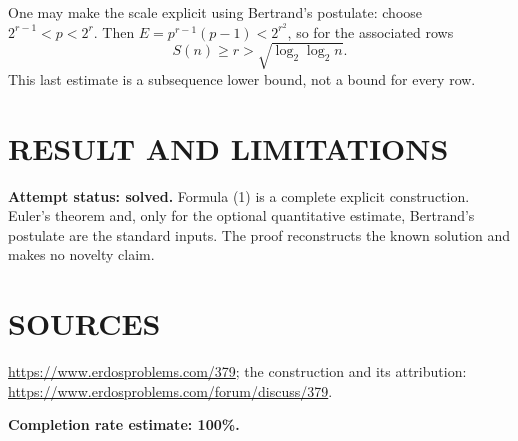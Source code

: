 One may make the scale explicit using Bertrand's postulate: choose $2^{r-1}<p<2^r$. Then $E=p^{r-1}(p-1)<2^{r^2}$, so for the associated rows
\[
S(n)\geq r>\sqrt{\log_2\log_2 n}.
\]
This last estimate is a subsequence lower bound, not a bound for every row.

\section{RESULT AND LIMITATIONS}
\textbf{Attempt status: solved.} Formula (1) is a complete explicit construction. Euler's theorem and, only for the optional quantitative estimate, Bertrand's postulate are the standard inputs. The proof reconstructs the known solution and makes no novelty claim.

\section{SOURCES}
\url{https://www.erdosproblems.com/379}; the construction and its attribution: \url{https://www.erdosproblems.com/forum/discuss/379}.

\textbf{Completion rate estimate: 100\%.}
